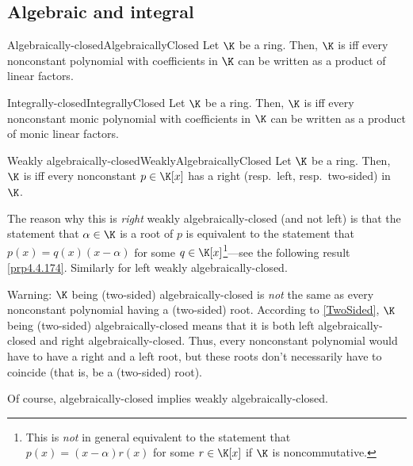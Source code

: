 \subsection{Algebraic and integral}

\begin{dfn}{Algebraically-closed}{AlgebraicallyClosed}
	Let $\K$ be a ring.  Then, $\K$ is  iff every nonconstant polynomial with coefficients in $\K$ can be written as a product of linear factors.
\end{dfn}
\begin{dfn}{Integrally-closed}{IntegrallyClosed}
	Let $\K$ be a ring.  Then, $\K$ is  iff every nonconstant monic polynomial with coefficients in $\K$ can be written as a product of monic linear factors.
\end{dfn}
\begin{dfn}{Weakly algebraically-closed}{WeaklyAlgebraicallyClosed}
	Let $\K$ be a ring.  Then, $\K$ is  iff every nonconstant $p\in \K [x]$ has a right (resp.~left, resp.~two-sided) in $\K$.
	\begin{rmk}
		The reason why this is \emph{right} weakly algebraically-closed (and not left) is that the statement that $\alpha \in \K$ is a root of $p$ is equivalent to the statement that $p(x)=q(x)(x-\alpha )$ for some $q\in \K [x]$\footnote{This is \emph{not} in general equivalent to the statement that $p(x)=(x-\alpha )r(x)$ for some $r\in \K [x]$ if $\K$ is noncommutative.}---see the following result \cref{prp4.4.174}.  Similarly for left weakly algebraically-closed.
	\end{rmk}
	\begin{rmk}
		Warning:  $\K$ being (two-sided) algebraically-closed is \emph{not} the same as every nonconstant polynomial having a (two-sided) root.  According to \cref{TwoSided}, $\K$ being (two-sided) algebraically-closed means that it is both left algebraically-closed and right algebraically-closed.  Thus, every nonconstant polynomial would have to have a right and a left root, but these roots don't necessarily have to coincide (that is, be a (two-sided) root).
	\end{rmk}
	\begin{rmk}
		Of course, algebraically-closed implies weakly algebraically-closed.
	\end{rmk}
\end{dfn}
